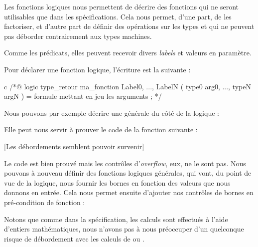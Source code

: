Les fonctions logiques nous permettent de décrire des fonctions qui ne seront 
utilisables que dans les spécifications. Cela nous permet, d'une part, de les 
factoriser, et d'autre part de définir des opérations sur les types  et 
 qui ne peuvent pas déborder contrairement aux types machines.



Comme les prédicats, elles peuvent recevoir divers \textit{labels} et valeurs en 
paramètre.





Pour déclarer une fonction logique, l'écriture est la suivante :



\begin{CodeBlock}{c}
/*@
  logic type_retour ma_fonction{ Label0, ..., LabelN }( type0 arg0, ..., typeN argN ) =
    formule mettant en jeu les arguments ;
*/
\end{CodeBlock}



Nous pouvons par exemple décrire une  générale du côté de la logique :






Elle peut nous servir à prouver le code de la fonction suivante :






[Les débordements semblent pouvoir survenir]


Le code est bien prouvé mais les contrôles d'\textit{overflow}, eux, ne le sont pas. Nous 
pouvons à nouveau définir des fonctions logiques générales, qui vont, du point de 
vue de la logique, nous fournir les bornes en fonction des valeurs que nous donnons
en entrée. Cela nous permet ensuite d'ajouter nos contrôles de bornes en 
pré-condition de fonction :






\begin{Information}
Notons que comme dans la spécification, les calculs sont effectués à l'aide 
d'entiers mathématiques, nous n'avons pas à nous préoccuper d'un quelconque
risque de débordement avec les calculs de  ou .
\end{Information}


